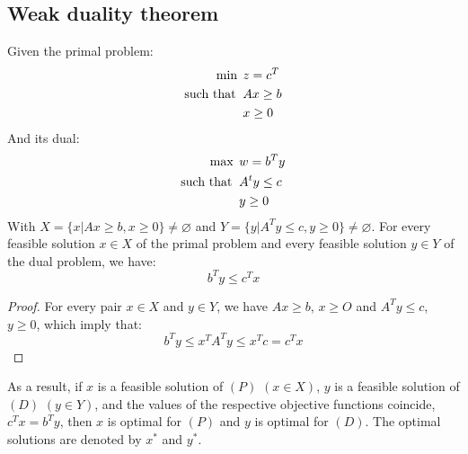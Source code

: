 \subsection{Weak duality theorem}
\begin{theorem}
    Given the primal problem: 
    \begin{align*}
        \min                      \:&\: z=c^T            \\
        \textnormal{such that }     &\: Ax\geq b         \\
                                    &\: x \geq 0
    \end{align*}
    And its dual: 
    \begin{align*}
        \max                      \:&\: w=b^Ty              \\
        \textnormal{such that }     &\: A^ty\leq c          \\
                                    &\: y \geq 0
    \end{align*}
    With $X=\{x|Ax \geq b, x \geq 0\} \neq \varnothing$ and $Y=\{y|A^Ty \leq c, y \geq 0\} \neq \varnothing$.
    For every feasible solution $x \in X$ of the primal problem and every feasible solution $y \in Y$ of the dual problem, we have: 
    \[b^Ty \leq c^Tx\]
\end{theorem}
\begin{proof}
    For every pair $x \in X$ and $y \in Y$, we have $Ax \geq b$, $x \geq O$ and $A^Ty \leq c$, $y \geq 0$, which imply that: 
    \[b^Ty \leq x^TA^Ty \leq x^Tc=c^Tx\]
\end{proof}
As a result, if $x$ is a feasible solution of $(P)$ $(x \in X)$, $y$ is a feasible solution of $(D)$ $(y \in Y)$, and the values of the respective objective functions coincide, $c^Tx=b^Ty$, then $x$ is optimal for $(P)$ and $y$ is optimal for $(D)$.
The optimal solutions are denoted by $x^{*}$ and $y^{*}$. 

